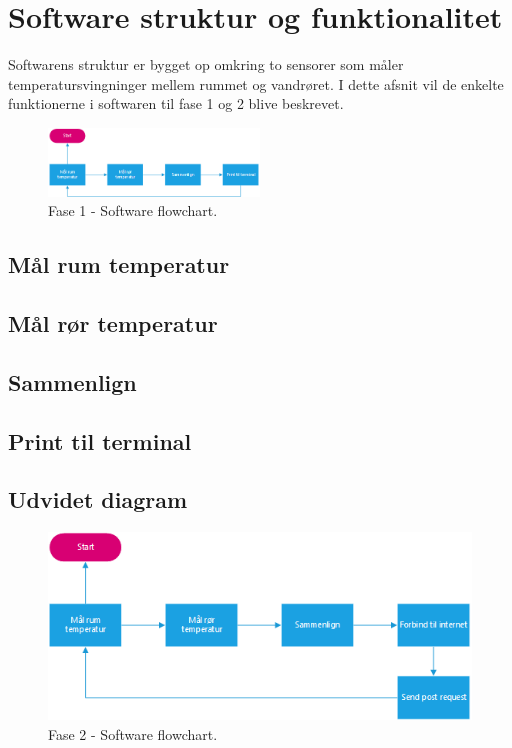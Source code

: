 \section{Software struktur og funktionalitet}
Softwarens struktur er bygget op omkring to sensorer som måler temperatursvingninger mellem rummet og vandrøret. I dette afsnit vil de enkelte funktionerne i softwaren til fase 1 og 2 blive beskrevet. 
\begin{figure}[h!]
  \centering
  \includegraphics[width=0.5\textwidth]{figures/Fase1software.png}
  \caption{Fase 1 - Software flowchart.}
\end{figure}


\subsection{Mål rum temperatur}
\subsection{Mål rør temperatur}
\subsection{Sammenlign}
\subsection{Print til terminal}

\subsection{Udvidet diagram}
\begin{figure}[h!]
  \centering
  \includegraphics[width=1\textwidth]{figures/Fase2software.png}
  \caption{Fase 2 - Software flowchart.}
\end{figure}